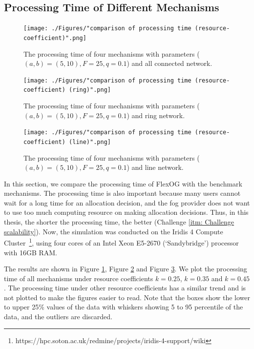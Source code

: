 \documentclass[11pt]{phdthesis}
\begin{document}
\subsection{Processing Time of Different Mechanisms}

\begin{figure}
    \centering
    \texttt{[image: ./Figures/"comparison of processing time (resource-coefficient)".png]}
    \caption{The processing time of four mechanisms with parameters ($ (a, b) = (5, 10), F = 25, q = 0.1 $) and all connected network.}
    \label{fig: processing time}
\end{figure}

\begin{figure}
    \centering
    \texttt{[image: ./Figures/"comparison of processing time (resource-coefficient) (ring)".png]}
    \caption{The processing time of four mechanisms with parameters ($ (a, b) = (5, 10), F = 25, q = 0.1 $) and ring network.}
    \label{fig: processing time_ring}
\end{figure}

\begin{figure}
    \centering
    \texttt{[image: ./Figures/"comparison of processing time (resource-coefficient) (line)".png]}
    \caption{The processing time of four mechanisms with parameters ($ (a, b) = (5, 10), F = 25, q = 0.1 $) and line network.}
    \label{fig: processing time_line}
\end{figure}

In this section, we compare the processing time of FlexOG with the benchmark mechanisms. The processing time is also important because many users cannot wait for a long time for an allocation decision, and the fog provider does not want to use too much computing resource on making allocation decisions. Thus, in this thesis, the shorter the processing time, the better (Challenge \ref{itm: Challenge scalability}). Now, the simulation was conducted on the Iridis 4 Compute Cluster~\footnote{https://hpc.soton.ac.uk/redmine/projects/iridis-4-support/wiki}, using four cores of an Intel Xeon E5-2670 (`Sandybridge') processor with 16GB RAM. 

The results are shown in Figure \ref{fig: processing time}, Figure \ref{fig: processing time_ring} and Figure \ref{fig: processing time_line}. We plot the processing time of all mechanisms under resource coefficients $ k = 0.25 $, $ k = 0.35 $ and $k = 0.45 $. The processing time under other resource coefficients has a similar trend and is not plotted to make the figures easier to read. Note that the boxes show the lower to upper 25\% values of the data with whiskers showing 5 to 95 percentile of the data, and the outliers are discarded. 
\end{document}
